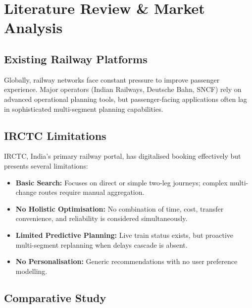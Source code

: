 \documentclass[12pt,a4paper]{report}
\begin{document}
\chapter{Literature Review \& Market Analysis}

\section{Existing Railway Platforms}

Globally, railway networks face constant pressure to improve passenger experience. Major operators (Indian Railways, Deutsche Bahn, SNCF) rely on advanced operational planning tools, but passenger-facing applications often lag in sophisticated multi-segment planning capabilities.

\section{IRCTC Limitations}

IRCTC, India's primary railway portal, has digitalised booking effectively but presents several limitations:

\begin{itemize}[leftmargin=1.5em]
  \item \textbf{Basic Search:} Focuses on direct or simple two-leg journeys; complex multi-change routes require manual aggregation.
  \item \textbf{No Holistic Optimisation:} No combination of time, cost, transfer convenience, and reliability is considered simultaneously.
  \item \textbf{Limited Predictive Planning:} Live train status exists, but proactive multi-segment replanning when delays cascade is absent.
  \item \textbf{No Personalisation:} Generic recommendations with no user preference modelling.
\end{itemize}

\section{Comparative Study}
\end{document}
